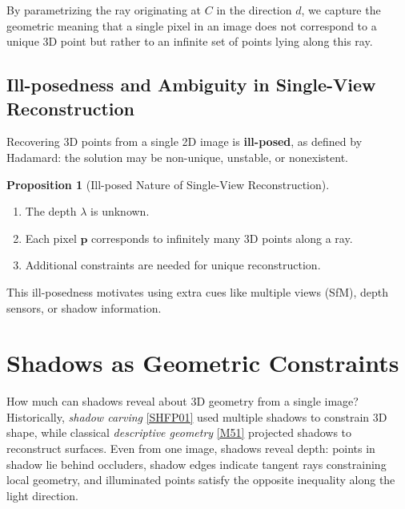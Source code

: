 \documentclass[12pt,a4paper]{article}
\theoremstyle{definition}
\newtheorem{proposition}{Proposition}[subsection]
\newcommand{\vect}[1]{\bm{#1}}
\begin{document}
By parametrizing the ray originating at \(C\) in the direction \(d\), we capture the geometric meaning that a single pixel in an image does not correspond to a unique 3D point but rather to an infinite set of points lying along this ray.

\newpage

\subsection{Ill-posedness and Ambiguity in Single-View Reconstruction} \label{sec: illposed}
\vspace{-0.5em}
Recovering 3D points from a single 2D image is \textbf{ill-posed}, as defined by Hadamard: the solution may be non-unique, unstable, or nonexistent.
\vspace{-0.5em}
\begin{proposition}[Ill-posed Nature of Single-View Reconstruction]~\
\begin{enumerate}[label=(\alph*), noitemsep, topsep=0pt, parsep=0pt, partopsep=0pt]
    \item The depth \(\lambda\) is unknown.
    \item Each pixel \(\vect{p}\) corresponds to infinitely many 3D points along a ray.
    \item Additional constraints are needed for unique reconstruction.
\end{enumerate}
\end{proposition}

This ill-posedness motivates using extra cues like multiple views (SfM), depth sensors, or shadow information.
\vspace{-1.5em}

\section{Shadows as Geometric Constraints}
\vspace{-1em}

How much can shadows reveal about 3D geometry from a single image? \\
Historically, \emph{shadow carving} \hyperlink{[SHFP01]}{[SHFP01]} used multiple shadows to constrain 3D shape, while classical \emph{descriptive geometry} \hyperlink{[M51]}{[M51]} projected shadows to reconstruct surfaces. Even from one image, shadows reveal depth: points in shadow lie behind occluders, shadow edges indicate tangent rays constraining local geometry, and illuminated points satisfy the opposite inequality along the light direction.
\end{document}
